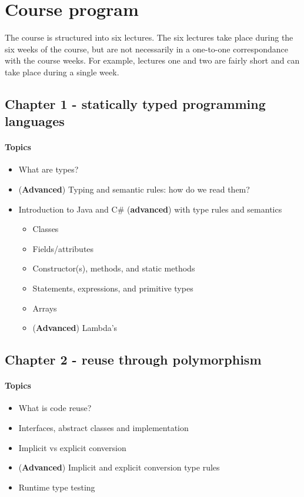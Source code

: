 \section{Course program}
The course is structured into six lectures.
The six lectures take place during the six weeks of the course, but are not necessarily in a one-to-one correspondance with the course weeks. For example, lectures one and two are fairly short and can take place during a single week.

\subsection{Chapter 1 - statically typed programming languages}
\paragraph*{Topics}
\begin{itemize}
	\item What are types?
	\item (\textbf{Advanced}) Typing and semantic rules: how do we read them?
	\item Introduction to Java and C\# (\textbf{advanced}) with type rules and semantics
	\begin{itemize}
		\item Classes
		\item Fields/attributes
		\item Constructor(s), methods, and static methods
		\item Statements, expressions, and primitive types
		\item Arrays
		\item (\textbf{Advanced}) Lambda's
	\end{itemize}
\end{itemize}

\subsection{Chapter 2 - reuse through polymorphism}
\paragraph*{Topics}			
\begin{itemize}
	\item What is code reuse?
	\item Interfaces, abstract classes and implementation
	\item Implicit vs explicit conversion
	\item (\textbf{Advanced}) Implicit and explicit conversion type rules
	\item Runtime type testing
\end{itemize}


